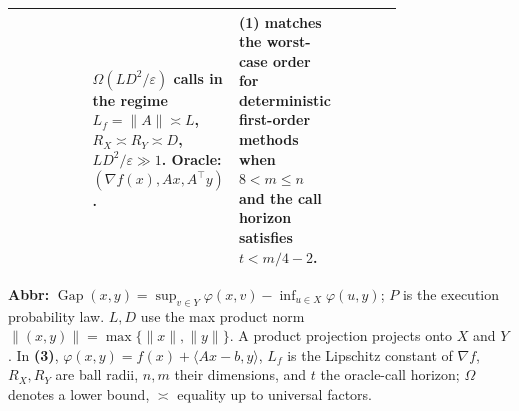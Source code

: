 \begin{table}[tp]
\begin{threeparttable}
\begin{tabularx}{\linewidth}{@{}>{\raggedright\arraybackslash}p{0.20\linewidth}>{\raggedright\arraybackslash}p{0.32\linewidth}>{\raggedright\arraybackslash}p{0.25\linewidth}>{\raggedright\arraybackslash}X@{}}
& $\Omega(LD^2/\varepsilon)$ calls in the regime $L_f=\|A\|\asymp L$, $R_X\asymp R_Y\asymp D$, $LD^2/\varepsilon\gg1$. Oracle: $(\nabla f(x),Ax,A^\top y)$.
& \textbf{(1)} matches the worst-case order for deterministic first-order methods when $8<m\le n$ and the call horizon satisfies $t<m/4-2$.
& \\
\bottomrule
\end{tabularx}
\begin{tablenotes}[flushleft]\footnotesize
\item[] \textbf{Abbr:} $\operatorname{Gap}(x,y)=\sup_{v\in Y}\varphi(x,v)-\inf_{u\in X}\varphi(u,y)$; $P$ is the execution probability law. $L,D$ use the max product norm $\|(x,y)\|=\max\{\|x\|,\|y\|\}$. A product projection projects onto $X$ and $Y$. In \textbf{(3)}, $\varphi(x,y)=f(x)+\langle Ax-b,y\rangle$, $L_f$ is the Lipschitz constant of $\nabla f$, $R_X,R_Y$ are ball radii, $n,m$ their dimensions, and $t$ the oracle-call horizon; $\Omega$ denotes a lower bound, $\asymp$ equality up to universal factors.
\end{tablenotes}
\end{threeparttable}
\end{table}
\clearpage
